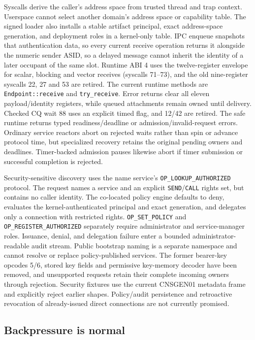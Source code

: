 Syscalls derive the caller's address space from trusted thread and trap context.
Userspace cannot select another domain's address space or capability table.
The signed loader also installs a stable artifact principal, exact address-space
generation, and deployment roles in a kernel-only table. IPC enqueue snapshots
that authentication data, so every current receive operation returns it
alongside the numeric sender ASID, so a delayed message cannot inherit the
identity of a later occupant of the same slot. Runtime ABI 4 uses the twelve-register
envelope for scalar, blocking and vector receives (syscalls 71--73), and the old
nine-register syscalls 22, 27 and 53 are retired. The current runtime methods
are \texttt{Endpoint::receive} and \texttt{try\_receive}. Error returns clear all
eleven payload/identity registers, while queued attachments remain owned until delivery. Checked CQ wait 88 uses an explicit timed flag, and 12/42 are retired.
The safe runtime returns typed readiness/deadline or admission/invalid-request
errors. Ordinary service reactors abort on rejected waits rather than spin or
advance protocol time, but specialized recovery retains the original pending owners
and deadlines. Timer-backed admission pauses likewise abort if timer
submission or successful completion is rejected.

Security-sensitive discovery uses the name service's
\texttt{OP\_LOOKUP\_AUTHORIZED} protocol. The request names a service and an
explicit \texttt{SEND}/\texttt{CALL} rights set, but contains no caller identity.
The co-located policy engine defaults to deny, evaluates the kernel-authenticated
principal and exact generation, and delegates only a connection with restricted rights.
\texttt{OP\_SET\_POLICY} and \texttt{OP\_REGISTER\_AUTHORIZED} separately require
administrator and service-manager roles. Issuance, denial, and delegation
failure enter a bounded administrator-readable audit stream. Public bootstrap
naming is a separate namespace and cannot resolve or replace policy-published
services. The former bearer-key opcodes 5/6, stored key fields and permissive
key-memory decoder have been removed, and unsupported requests retain their complete
incoming owners through rejection. Security fixtures use the current CNSGEN01
metadata frame and explicitly reject earlier shapes. Policy/audit persistence and retroactive
revocation of already-issued direct connections are not currently promised.

\subsection{Backpressure is normal}

